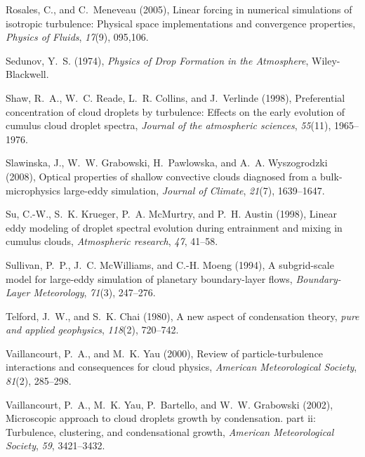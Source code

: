 \documentclass[draft,linenumbers]{agujournal}
\begin{document}
\begin{thebibliography}{60}
Rosales, C., and C.~Meneveau (2005), Linear forcing in numerical simulations of
  isotropic turbulence: Physical space implementations and convergence
  properties, \textit{Physics of Fluids}, \textit{17}(9), 095,106.

Sedunov, Y.~S. (1974), \textit{Physics of Drop Formation in the Atmosphere},
  Wiley-Blackwell.

Shaw, R.~A., W.~C. Reade, L.~R. Collins, and J.~Verlinde (1998), Preferential
  concentration of cloud droplets by turbulence: Effects on the early evolution
  of cumulus cloud droplet spectra, \textit{Journal of the atmospheric
  sciences}, \textit{55}(11), 1965--1976.

Slawinska, J., W.~W. Grabowski, H.~Pawlowska, and A.~A. Wyszogrodzki (2008),
  Optical properties of shallow convective clouds diagnosed from a
  bulk-microphysics large-eddy simulation, \textit{Journal of Climate},
  \textit{21}(7), 1639--1647.

Su, C.-W., S.~K. Krueger, P.~A. McMurtry, and P.~H. Austin (1998), Linear eddy
  modeling of droplet spectral evolution during entrainment and mixing in
  cumulus clouds, \textit{Atmospheric research}, \textit{47}, 41--58.

Sullivan, P.~P., J.~C. McWilliams, and C.-H. Moeng (1994), A subgrid-scale
  model for large-eddy simulation of planetary boundary-layer flows,
  \textit{Boundary-Layer Meteorology}, \textit{71}(3), 247--276.

Telford, J.~W., and S.~K. Chai (1980), A new aspect of condensation theory,
  \textit{pure and applied geophysics}, \textit{118}(2), 720--742.

Vaillancourt, P.~A., and M.~K. Yau (2000), Review of particle-turbulence
  interactions and consequences for cloud physics, \textit{American
  Meteorological Society}, \textit{81}(2), 285--298.

Vaillancourt, P.~A., M.~K. Yau, P.~Bartello, and W.~W. Grabowski (2002),
  Microscopic approach to cloud droplets growth by condensation. part ii:
  Turbulence, clustering, and condensational growth, \textit{American
  Meteorological Society}, \textit{59}, 3421--3432.


\end{thebibliography}
\end{document}
